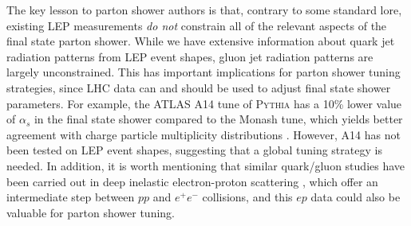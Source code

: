 \documentclass[11pt]{cernrep}
\begin{document}
The key lesson to parton shower authors is that, contrary to some standard lore, existing LEP measurements \emph{do not} constrain all of the relevant aspects of the final state parton shower.  While we have extensive information about quark jet radiation patterns from LEP event shapes, gluon jet radiation patterns are largely unconstrained.  This has important implications for parton shower tuning strategies, since LHC data can and should be used to adjust final state shower parameters.  For example, the ATLAS A14 tune of \textsc{Pythia} has a 10\% lower value of $\alpha_s$ in the final state shower compared to the Monash tune, which yields better agreement with charge particle multiplicity distributions \cite{Aad:2016oit}.  However, A14 has not been tested on LEP event shapes, suggesting that a global tuning strategy is needed.   In addition, it is worth mentioning that similar quark/gluon studies have been carried out in deep inelastic electron-proton scattering \cite{Chekanov:2004kz}, which offer an intermediate step between $pp$ and $e^+ e^-$ collisions, and this $ep$ data could also be valuable for parton shower tuning.
\end{document}

